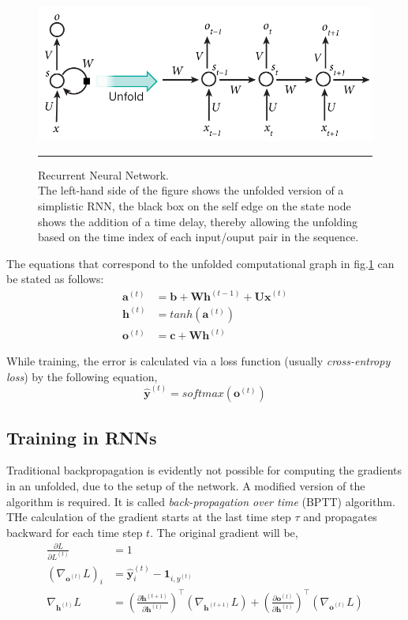 \begin{figure}[H]
		\centering
		\includegraphics[scale=0.4]{Pictures/rnn.jpg}
		\rule{35em}{0.5pt}
		\caption[Recurrent Neural Network]{Recurrent Neural Network. \\ The left-hand side of the figure shows the unfolded version of a simplistic RNN, the black box on the self edge on the state node shows the addition of a time delay, thereby allowing the unfolding based on the time index of each input/ouput pair in the sequence.}
		\label{fig:rnn}
\end{figure}

The equations that correspond to the unfolded computational graph in fig.\ref{fig:rnn} can be stated as follows:
\begin{align*}
\bm{a}^{(t)} &= \bm b + \bm{Wh}^{(t-1)} + \bm{Ux}^{(t)} \\
\bm{h}^{(t)} &= tanh(\bm{a}^{(t)}) \\
\bm{o}^{(t)} &= \bm c + \bm{Wh}^{(t)}
\end{align*}

While training, the error is calculated via a loss function (usually \textit{cross-entropy loss}) by the following equation,
\begin{equation}
\hat{\bm y}^{(t)} = softmax(\bm{o}^{(t)})
\end{equation}
\subsection*{Training in RNNs}
Traditional backpropagation is evidently not possible for computing the gradients in an unfolded, due to the setup of the network. A modified version of the algorithm is required. It is called \textit{back-propagation over time} (BPTT) algorithm. THe calculation of the gradient starts at the last time step $\tau$ and propagates backward for each time step $t$. The original gradient will be,
\begin{align*}
\frac{\partial L}{\partial L^{(t)}} &= 1 \\
\left(\nabla_{\bm{o}^{(t)}}L\right)_{i} &= \hat{\bm{y}}_{i}^{(t)} - \bm 1 _{i,y^{(t)}} \\
\nabla_{\bm{h}^{(t)}}L &= \left(\frac{\partial \bm{h}^{(t+1)}}{\partial \bm{h}^{(t)}} \right) ^{\top}(\nabla_{\bm{h}^{(t+1)}}L) + \left(\frac{\partial \bm{o}^{(t)}}{\partial \bm{h}^{(t)}} \right) ^{\top} (\nabla_{\bm{o}^{(t)}}L)
\end{align*}
